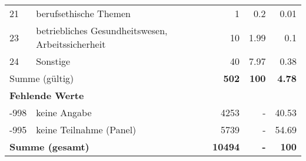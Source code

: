 \begin{longtable}{lXrrr}
        21 & \multicolumn{1}{X}{berufsethische Themen} & %
          \num{1} &
          \num[round-mode=places,round-precision=2]{0.2} &
          \num[round-mode=places,round-precision=2]{0.01} \\

        23 & \multicolumn{1}{X}{betriebliches Gesundheitswesen, Arbeitssicherheit} & %
          \num{10} &
          \num[round-mode=places,round-precision=2]{1.99} &
          \num[round-mode=places,round-precision=2]{0.1} \\

        24 & \multicolumn{1}{X}{Sonstige} & %
          \num{40} &
          \num[round-mode=places,round-precision=2]{7.97} &
          \num[round-mode=places,round-precision=2]{0.38} \\

     \midrule
     \multicolumn{2}{l}{Summe (gültig)} &
       \textbf{\num{502}} &
     \textbf{\num{100}} &
       \textbf{\num[round-mode=places,round-precision=2]{4.78}} \\
     \multicolumn{5}{l}{\textbf{Fehlende Werte}}\\
       -998 &
       keine Angabe &
         \num{4253} &
        - &
         \num[round-mode=places,round-precision=2]{40.53} \\
       -995 &
       keine Teilnahme (Panel) &
         \num{5739} &
        - &
         \num[round-mode=places,round-precision=2]{54.69} \\
     \midrule
     \multicolumn{2}{l}{\textbf{Summe (gesamt)}} &
          \textbf{\num{10494}} &
        \textbf{-} &
        \textbf{\num{100}} \\
     \bottomrule
     \end{longtable}
     
